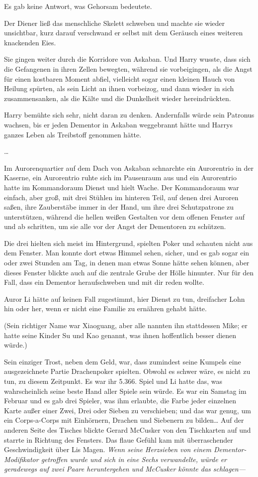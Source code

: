 {Es gab keine Antwort, was Gehorsam bedeutete.

Der Diener ließ das menschliche Skelett schweben und machte sie wieder unsichtbar, kurz darauf verschwand er selbst mit dem Geräusch eines weiteren knackenden Eies.

Sie gingen weiter durch die Korridore von Askaban. Und Harry wusste, dass sich die Gefangenen in ihren Zellen bewegten, während sie vorbeigingen, als die Angst für einen kostbaren Moment abfiel, vielleicht sogar einen kleinen Hauch von Heilung spürten, als sein Licht an ihnen vorbeizog, und dann wieder in sich zusammensanken, als die Kälte und die Dunkelheit wieder hereindrückten.

Harry bemühte sich sehr, nicht daran zu denken. Andernfalls würde sein Patronus wachsen, bis er jeden Dementor in Askaban weggebrannt hätte und Harrys ganzes Leben als Treibstoff genommen hätte.

…

Im Aurorenquartier auf dem Dach von Askaban schnarchte ein Aurorentrio in der Kaserne, ein Aurorentrio ruhte sich im Pausenraum aus und ein Aurorentrio hatte im Kommandoraum Dienst und hielt Wache. Der Kommandoraum war einfach, aber groß, mit drei Stühlen im hinteren Teil, auf denen drei Auroren saßen, ihre Zauberstäbe immer in der Hand, um ihre drei Schutzpatrone zu unterstützen, während die hellen weißen Gestalten vor dem offenen Fenster auf und ab schritten, um sie alle vor der Angst der Dementoren zu schützen.

Die drei hielten sich meist im Hintergrund, spielten Poker und schauten nicht aus dem Fenster. Man konnte dort etwas Himmel sehen, sicher, und es gab sogar ein oder zwei Stunden am Tag, in denen man etwas Sonne hätte sehen können, aber dieses Fenster blickte auch auf die zentrale Grube der Hölle hinunter. Nur für den Fall, dass ein Dementor heraufschweben und mit dir reden wollte.

Auror Li hätte auf keinen Fall zugestimmt, hier Dienst zu tun, dreifacher Lohn hin oder her, wenn er nicht eine Familie zu ernähren gehabt hätte.

(Sein richtiger Name war Xiaoguang, aber alle nannten ihn stattdessen Mike; er hatte seine Kinder Su und Kao genannt, was ihnen hoffentlich besser dienen würde.)

Sein einziger Trost, neben dem Geld, war, dass zumindest seine Kumpels eine ausgezeichnete Partie Drachenpoker spielten. Obwohl es schwer wäre, es nicht zu tun, zu diesem Zeitpunkt. Es war ihr 5.366. Spiel und Li hatte das, was wahrscheinlich seine beste Hand aller Spiele sein würde. Es war ein Samstag im Februar und es gab drei Spieler, was ihm erlaubte, die Farbe jeder einzelnen Karte außer einer Zwei, Drei oder Sieben zu verschieben; und das war genug, um ein Corps-a-Corps mit Einhörnern, Drachen und Siebenern zu bilden… Auf der anderen Seite des Tisches blickte Gerard McCusker von den Tischkarten auf und starrte in Richtung des Fensters. Das flaue Gefühl kam mit überraschender Geschwindigkeit über Lis Magen. \emph{Wenn seine Herzsieben von einem Dementor-Modifikator getroffen wurde und sich in eine Sechs verwandelte, würde er geradewegs auf zwei Paare heruntergehen und McCusker könnte das schlagen—}

}
